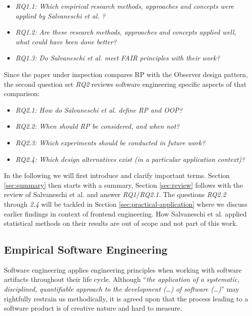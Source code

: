 \documentclass[12pt,a4paper]{article}
\begin{document}
\begin{itemize}
	\item \emph{RQ1.1: Which empirical research methods, approaches and concepts were applied by Salvaneschi et al. \cite{7827078}?}
	\item \emph{RQ1.2: Are these research methods, approaches and concepts applied well, what could have been done better?}
	\item \emph{RQ1.3: Do Salvaneschi et al. \cite{7827078} meet FAIR principles \cite{2019arXiv190805986H} \cite{wilkinson:2016} with their work?}
\end{itemize}

Since the paper under inspection compares RP with the Observer design pattern, the second question set \emph{RQ2} reviews software engineering specific aspects of that comparison:

\begin{itemize}
	\item \emph{RQ2.1: How do Salvaneschi et al. \cite{7827078} define RP and OOP?}
	\item \emph{RQ2.2: When should RP be considered, and when not?}
	\item \emph{RQ2.3: Which experiments should be conducted in future work?}
	\item \emph{RQ2.4: Which design alternatives exist (in a particular application context)?}
\end{itemize}

In the following we will first introduce and clarify important terms. Section \ref{sec:summary} then starts with a summary, Section \ref{sec:review} follows with the review of Salvaneschi et al. and answer \emph{RQ1}/\emph{RQ2.1}. The questions \emph{RQ2.2} through \emph{2.4} will be tackled in Section \ref{sec:practical-application} where we discuss earlier findings in context of frontend engineering. How Salvaneschi et al. applied statistical methods on their results are out of scope and not part of this work.

\subsection{Empirical Software Engineering}

Software engineering applies engineering principles when working with software artifacts \cite{159342} throughout their life cycle. Although ``\emph{the application of a systematic, disciplined, quantifiable approach to the development (\dots) of software (\dots)}'' \cite{159342} may rightfully restrain us methodically, it is agreed upon that the process leading to a software product is of creative nature \cite{8051350} and hard to measure.
\end{document}
